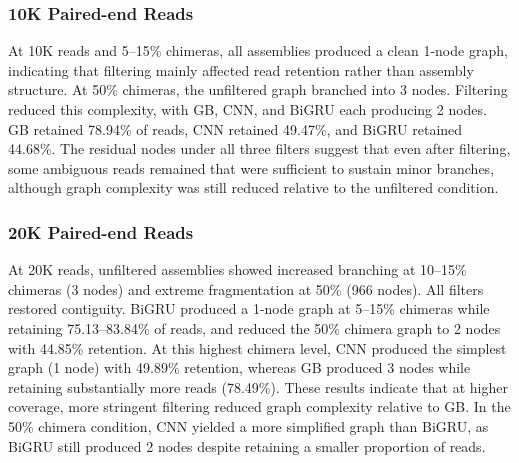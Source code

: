 \subsubsection{10K Paired-end Reads}
At 10K reads and 5--15\% chimeras, all assemblies produced a clean 1-node graph, indicating that filtering mainly affected read retention rather than assembly structure. At 50\% chimeras, the unfiltered graph branched into 3 nodes. Filtering reduced this complexity, with GB, CNN, and BiGRU each producing 2 nodes. GB retained 78.94\% of reads, CNN retained 49.47\%, and BiGRU retained 44.68\%. The residual nodes under all three filters suggest that even after filtering, some ambiguous reads remained that were sufficient to sustain minor branches, although graph complexity was still reduced relative to the unfiltered condition.

\subsubsection{20K Paired-end Reads}
At 20K reads, unfiltered assemblies showed increased branching at 10--15\% chimeras (3 nodes) and extreme fragmentation at 50\% (966 nodes). All filters restored contiguity. BiGRU produced a 1-node graph at 5--15\% chimeras while retaining 75.13--83.84\% of reads, and reduced the 50\% chimera graph to 2 nodes with 44.85\% retention. At this highest chimera level, CNN produced the simplest graph (1 node) with 49.89\% retention, whereas GB produced 3 nodes while retaining substantially more reads (78.49\%). These results indicate that at higher coverage, more stringent filtering reduced graph complexity relative to GB. In the 50\% chimera condition, CNN yielded a more simplified graph than BiGRU, as BiGRU still produced 2 nodes despite retaining a smaller proportion of reads.

